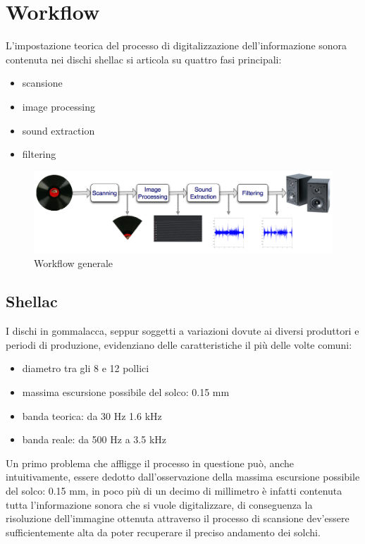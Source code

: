 \section{Workflow}
L'impostazione teorica del processo di digitalizzazione dell'informazione sonora contenuta nei dischi shellac si articola su quattro fasi principali:
\begin{itemize}
	\item scansione
	\item image processing
	\item sound extraction
	\item filtering
\end{itemize}
\begin{figure}[h!t]
\begin{center}
\includegraphics[scale=0.2]{./img/block-scheme.png}
\caption{Workflow generale}
\end{center}
\end{figure}
\subsection{Shellac}
I dischi in gommalacca, seppur soggetti a variazioni dovute ai diversi produttori e periodi di produzione, evidenziano delle caratteristiche il pi\`u delle volte comuni:
\begin{itemize}
	\item diametro tra gli 8 e 12 pollici
	\item massima escursione possibile del solco: 0.15 mm
	\item banda teorica: da 30 Hz 1.6 kHz
	\item banda reale: da 500 Hz a 3.5 kHz
\end{itemize}
Un primo problema che affligge il processo in questione pu\`o, anche intuitivamente, essere dedotto dall'osservazione della massima escursione possibile del solco: 0.15 mm, in poco pi\`u di un decimo di millimetro \`e infatti contenuta tutta l'informazione sonora che si vuole digitalizzare, di conseguenza la risoluzione dell'immagine ottenuta attraverso il processo di scansione dev'essere sufficientemente alta da poter recuperare il preciso andamento dei solchi.

